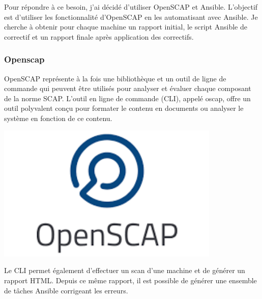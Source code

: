 \documentclass[12pt]{article}
\begin{document}
Pour répondre à ce besoin, j'ai décidé d'utiliser \gls{OpenSCAP} et \gls{Ansible}. 
L'objectif est d'utiliser les fonctionnalité d'\gls{OpenSCAP} en les automatisant avec \gls{Ansible}.
Je cherche à obtenir pour chaque machine un rapport initial, le script \gls{Ansible} de correctif et un rapport finale après application des correctifs. 

\subsubsection{Openscap}
\noindent%
\begin{minipage}{.7\textwidth}%
OpenSCAP représente à la fois une bibliothèque et un outil de ligne de commande qui peuvent être utilisés pour analyser et évaluer chaque composant de la norme \gls{SCAP}. 
L'outil en ligne de commande (\gls{CLI}), appelé oscap, offre un outil polyvalent conçu pour formater le contenu en documents ou analyser le système en fonction de ce contenu. \cite{OpenSCAP} \\
\end{minipage}%
\hfill
\begin{minipage}{.3\textwidth}%
\begin{center}
\includegraphics[width=0.8\textwidth]{src/logo_openscap.png}
\end{center}
\end{minipage}%

Le \gls{CLI} permet également d'effectuer un scan d'une machine et de générer un rapport HTML.
Depuis ce même rapport, il est possible de générer une ensemble de tâches \gls{Ansible} corrigeant les erreurs.
\end{document}
